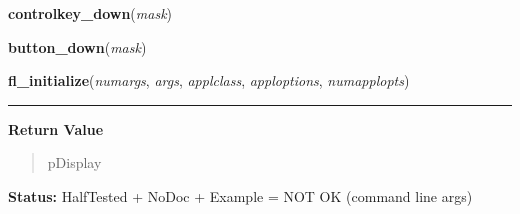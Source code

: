     \vspace{0.5ex}

\hspace{.8\funcindent}\begin{boxedminipage}{\funcwidth}

    \raggedright \textbf{controlkey\_down}(\textit{mask})

\setlength{\parskip}{2ex}
\setlength{\parskip}{1ex}
    \end{boxedminipage}

    \label{xformslib:library:button_down}

    \vspace{0.5ex}

\hspace{.8\funcindent}\begin{boxedminipage}{\funcwidth}

    \raggedright \textbf{button\_down}(\textit{mask})

\setlength{\parskip}{2ex}
\setlength{\parskip}{1ex}
    \end{boxedminipage}

    \label{xformslib:library:fl_initialize}

    \vspace{0.5ex}

\hspace{.8\funcindent}\begin{boxedminipage}{\funcwidth}

    \raggedright \textbf{fl\_initialize}(\textit{numargs}, \textit{args}, \textit{applclass}, \textit{apploptions}, \textit{numapplopts})

    \vspace{-1.5ex}

    \rule{\textwidth}{0.5\fboxrule}
\setlength{\parskip}{2ex}
\setlength{\parskip}{1ex}
      \textbf{Return Value}
    \vspace{-1ex}

      \begin{quote}
      pDisplay

      \end{quote}

\textbf{Status:} HalfTested + NoDoc + Example = NOT OK (command line args)



    \end{boxedminipage}

